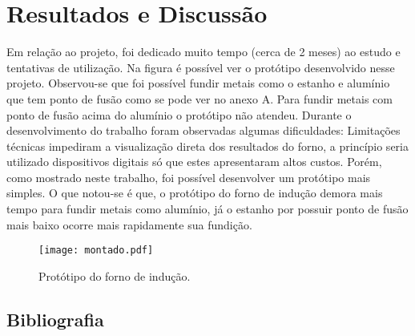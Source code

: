 \documentclass[a4paper,12pt]{article}%
\begin{document}
\section{Resultados e Discussão}
Em relação ao projeto, foi dedicado muito tempo (cerca de 2 meses) ao estudo e tentativas de utilização. Na figura é possível ver o protótipo desenvolvido nesse projeto.
Observou-se que foi possível fundir metais como o estanho e alumínio que tem ponto de fusão como se pode ver no anexo A. Para fundir metais com ponto de fusão acima do alumínio o protótipo não atendeu.
Durante o desenvolvimento do trabalho foram observadas algumas dificuldades: Limitações técnicas impediram a visualização direta dos resultados do forno, a princípio seria utilizado dispositivos digitais só que estes apresentaram altos custos. Porém, como mostrado neste trabalho, foi possível desenvolver um protótipo mais simples. 
O que notou-se é que, o protótipo do forno de indução demora mais tempo para fundir metais como alumínio, já o estanho por possuir ponto de fusão mais baixo ocorre mais rapidamente sua fundição. 

\begin{figure}
	\centering	
	\texttt{[image: montado.pdf]}
	\caption{Protótipo do forno de indução.}
	\label{fig:03}
\end{figure}
\newpage
\subsection{Bibliografia}


\end{document}
